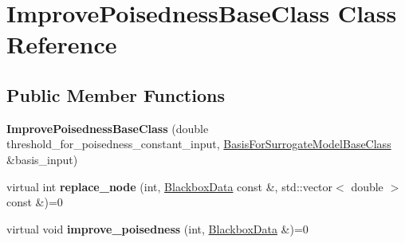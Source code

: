 \hypertarget{class_improve_poisedness_base_class}{}\section{Improve\+Poisedness\+Base\+Class Class Reference}
\label{class_improve_poisedness_base_class}
\subsection*{Public Member Functions}
\begin{DoxyCompactItemize}
\item 
{\bfseries Improve\+Poisedness\+Base\+Class} (double threshold\+\_\+for\+\_\+poisedness\+\_\+constant\+\_\+input, \hyperlink{class_basis_for_surrogate_model_base_class}{Basis\+For\+Surrogate\+Model\+Base\+Class} \&basis\+\_\+input)\hypertarget{class_improve_poisedness_base_class_a5bb97bd1469745893600fc9c98671c95}{}\label{class_improve_poisedness_base_class_a5bb97bd1469745893600fc9c98671c95}

\item 
virtual int {\bfseries replace\+\_\+node} (int, \hyperlink{struct_blackbox_data}{Blackbox\+Data} const \&, std\+::vector$<$ double $>$ const \&)=0\hypertarget{class_improve_poisedness_base_class_aa7b7d7354eafd6bcdbe1a25f6e518ef8}{}\label{class_improve_poisedness_base_class_aa7b7d7354eafd6bcdbe1a25f6e518ef8}

\item 
virtual void {\bfseries improve\+\_\+poisedness} (int, \hyperlink{struct_blackbox_data}{Blackbox\+Data} \&)=0\hypertarget{class_improve_poisedness_base_class_af3cb31e17b73c88d4a83567c995630c8}{}\label{class_improve_poisedness_base_class_af3cb31e17b73c88d4a83567c995630c8}

\end{DoxyCompactItemize}
